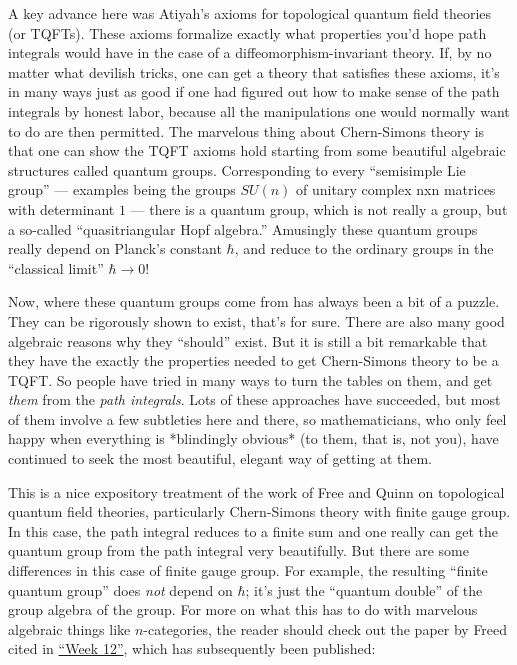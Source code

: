 \documentclass{article}
\def\tightlist{}
\renewcommand{\texttt}[1]{%
  \begingroup
  \ttfamily
  \begingroup\lccode`~=`/\lowercase{\endgroup\def~}{/\discretionary{}{}{}}%
  \begingroup\lccode`~=`[\lowercase{\endgroup\def~}{[\discretionary{}{}{}}%
  \begingroup\lccode`~=`.\lowercase{\endgroup\def~}{.\discretionary{}{}{}}%
  \catcode`/=\active\catcode`[=\active\catcode`.=\active
  \scantokens{#1\noexpand}%
  \endgroup
}
\begin{document}
A key advance here was Atiyah's axioms for topological quantum field
theories (or TQFTs). These axioms formalize exactly what properties
you'd hope path integrals would have in the case of a
diffeomorphism-invariant theory. If, by no matter what devilish tricks,
one can get a theory that satisfies these axioms, it's in many ways just
as good if one had figured out how to make sense of the path integrals
by honest labor, because all the manipulations one would normally want
to do are then permitted. The marvelous thing about Chern-Simons theory
is that one can show the TQFT axioms hold starting from some beautiful
algebraic structures called quantum groups. Corresponding to every
``semisimple Lie group'' --- examples being the groups \(SU(n)\) of
unitary complex nxn matrices with determinant \(1\) --- there is a
quantum group, which is not really a group, but a so-called
``quasitriangular Hopf algebra.'' Amusingly these quantum groups really
depend on Planck's constant \(\hbar\), and reduce to the ordinary groups
in the ``classical limit'' \(\hbar \to 0\)!

Now, where these quantum groups come from has always been a bit of a
puzzle. They can be rigorously shown to exist, that's for sure. There
are also many good algebraic reasons why they ``should'' exist. But it
is still a bit remarkable that they have the exactly the properties
needed to get Chern-Simons theory to be a TQFT. So people have tried in
many ways to turn the tables on them, and get \emph{them} from the
\emph{path integrals}. Lots of these approaches have succeeded, but most
of them involve a few subtleties here and there, so mathematicians, who
only feel happy when everything is *blindingly obvious* (to them, that
is, not you), have continued to seek the most beautiful, elegant way of
getting at them.


This is a nice expository treatment of the work of Free and Quinn on
topological quantum field theories, particularly Chern-Simons theory
with finite gauge group. In this case, the path integral reduces to a
finite sum and one really can get the quantum group from the path
integral very beautifully. But there are some differences in this case
of finite gauge group. For example, the resulting ``finite quantum
group'' does \emph{not} depend on \(\hbar\); it's just the ``quantum
double'' of the group algebra of the group. For more on what this has to
do with marvelous algebraic things like \(n\)-categories, the reader
should check out the paper by Freed cited in
\protect\hyperlink{week12}{``Week 12''}, which has subsequently been
published:
\end{document}
